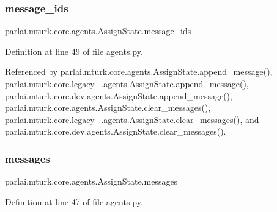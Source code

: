 \mbox{\label{classparlai_1_1mturk_1_1core_1_1agents_1_1AssignState_a11bf85034efc6e223c6a58a695b022b8}} 
\subsubsection{\texorpdfstring{message\+\_\+ids}{message\_ids}}
{\footnotesize\ttfamily parlai.\+mturk.\+core.\+agents.\+Assign\+State.\+message\+\_\+ids}



Definition at line 49 of file agents.\+py.



Referenced by parlai.\+mturk.\+core.\+agents.\+Assign\+State.\+append\+\_\+message(), parlai.\+mturk.\+core.\+legacy\+\_.\+agents.\+Assign\+State.\+append\+\_\+message(), parlai.\+mturk.\+core.\+dev.\+agents.\+Assign\+State.\+append\+\_\+message(), parlai.\+mturk.\+core.\+agents.\+Assign\+State.\+clear\+\_\+messages(), parlai.\+mturk.\+core.\+legacy\+\_.\+agents.\+Assign\+State.\+clear\+\_\+messages(), and parlai.\+mturk.\+core.\+dev.\+agents.\+Assign\+State.\+clear\+\_\+messages().

\mbox{\label{classparlai_1_1mturk_1_1core_1_1agents_1_1AssignState_a8f08edc51460fb9ad6afc26c60e19990}} 
\subsubsection{\texorpdfstring{messages}{messages}}
{\footnotesize\ttfamily parlai.\+mturk.\+core.\+agents.\+Assign\+State.\+messages}



Definition at line 47 of file agents.\+py.



